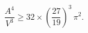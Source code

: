 \begin{equation}
\frac{A^4}{V^3} \ge 32 \times
\left(\frac{27}{19}\right)^3\,\pi^2.
\end{equation}

